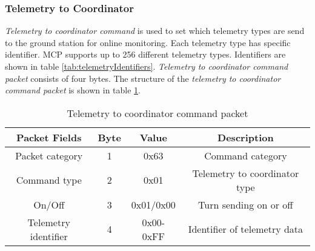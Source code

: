 \subsubsection{Telemetry to Coordinator}
\label{sec:TelemetryToCoordinatorCommand}
\textit{Telemetry to coordinator command} is used to set which telemetry types are send to the ground station for online monitoring. Each telemetry type has specific identifier. MCP supports up to 256 different telemetry types. Identifiers are shown in table \ref{tab:telemetryIdentifiers}. \textit{Telemetry to coordinator command packet} consists of four bytes. The structure of the \textit{telemetry to coordinator command packet} is shown in table \ref{tab:telemetryToCoordinatorCommandPacket}.
\begin{table}[h]
\begin{center}
\begin{tabular}{c c c c}
\toprule
\rowcolor[HTML]{FFFC9E} 
\textbf{Packet Fields} & \textbf{Byte} & \textbf{Value} & \textbf{Description}          \\ \midrule
Packet category        & 1             & 0x63                & Command category              \\  [1ex] 
Command type           & 2             & 0x01                & Telemetry to coordinator type \\ [1ex] 
On/Off                 & 3             & 0x01/0x00           & Turn sending on or off        \\ 
[1ex] 
Telemetry identifier   & 4             & 0x00-0xFF           & Identifier of telemetry data  \\ 
[1ex]  \bottomrule
\end{tabular}
\end{center}
\caption{Telemetry to coordinator command packet}
\label{tab:telemetryToCoordinatorCommandPacket}
\end{table}

